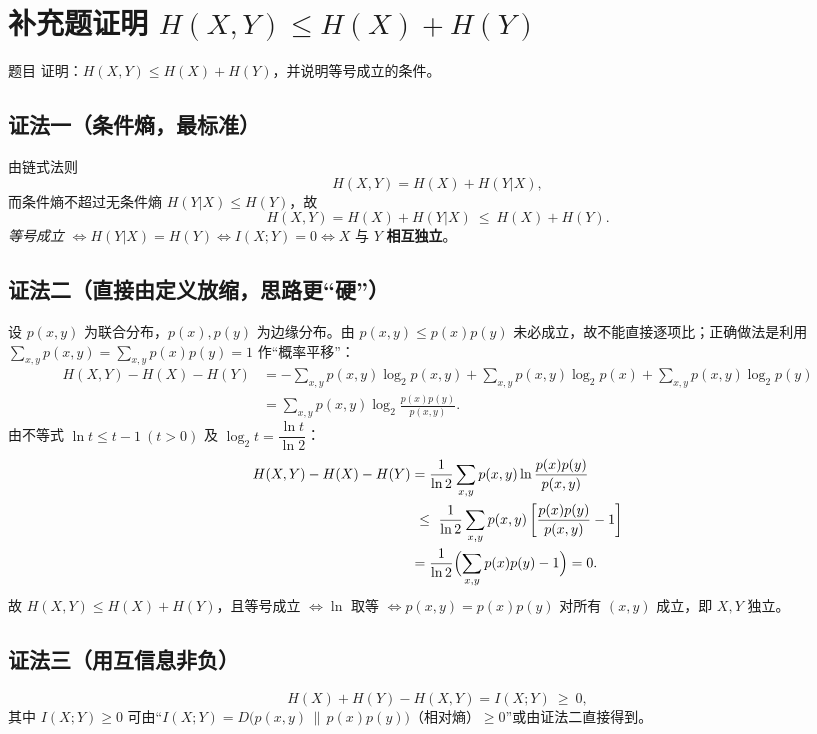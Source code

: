 \documentclass[11pt,a4paper]{ctexart}
\newcommand{\Hx}[1]{H\!\left(#1\right)}
\newcommand{\I}[1]{I\!\left(#1\right)}
\newcommand{\lb}{\log_{2}}
\begin{document}
\section*{补充题\quad 证明 $\Hx{X,Y}\le \Hx{X}+\Hx{Y}$}

\begin{problem}{题目}
证明：$\Hx{X,Y}\le \Hx{X}+\Hx{Y}$，并说明等号成立的条件。
\end{problem}

\subsection*{证法一（条件熵，最标准）}
由链式法则
\[
\Hx{X,Y}=\Hx{X}+\Hx{Y|X},
\]
而条件熵不超过无条件熵 $\Hx{Y|X}\le\Hx{Y}$，故
\[
\Hx{X,Y}=\Hx{X}+\Hx{Y|X}\ \le\ \Hx{X}+\Hx{Y}.
\]
\emph{等号成立} $\iff \Hx{Y|X}=\Hx{Y}\iff \I{X;Y}=0\iff X$ 与 $Y$ \textbf{相互独立}。

\subsection*{证法二（直接由定义放缩，思路更“硬”）}
设 $p(x,y)$ 为联合分布，$p(x),p(y)$ 为边缘分布。由 $p(x,y)\le p(x)p(y)$ 未必成立，故不能直接逐项比；正确做法是利用
$\sum_{x,y}p(x,y)=\sum_{x,y}p(x)p(y)=1$ 作“概率平移”：
\begin{align*}
\Hx{X,Y}-\Hx{X}-\Hx{Y}
&=-\sum_{x,y}p(x,y)\lb p(x,y)+\sum_{x,y}p(x,y)\lb p(x)+\sum_{x,y}p(x,y)\lb p(y)\\
&=\sum_{x,y}p(x,y)\lb\frac{p(x)p(y)}{p(x,y)} .
\end{align*}
由不等式 $\ln t\le t-1\ (t>0)$ 及 $\lb t=\dfrac{\ln t}{\ln 2}$：
\begin{align*}
\Hx{X,Y}-\Hx{X}-\Hx{Y}
&=\frac{1}{\ln 2}\sum_{x,y}p(x,y)\ln\frac{p(x)p(y)}{p(x,y)}\\
&\ \le\ \frac{1}{\ln 2}\sum_{x,y}p(x,y)\left[\frac{p(x)p(y)}{p(x,y)}-1\right]\\
&=\frac{1}{\ln2}\Bigl(\sum_{x,y}p(x)p(y)-1\Bigr)=0 .
\end{align*}
故 $\Hx{X,Y}\le\Hx{X}+\Hx{Y}$，且等号成立 $\iff \ln$ 取等 $\iff p(x,y)=p(x)p(y)$ 对所有 $(x,y)$ 成立，即 $X,Y$ 独立。

\subsection*{证法三（用互信息非负）}
\[
\Hx{X}+\Hx{Y}-\Hx{X,Y}=\I{X;Y}\ \ge\ 0 ,
\]
其中 $\I{X;Y}\ge 0$ 可由“$\I{X;Y}=D\bigl(p(x,y)\,\|\,p(x)p(y)\bigr)$（相对熵）$\ge 0$”或由证法二直接得到。
\end{document}
